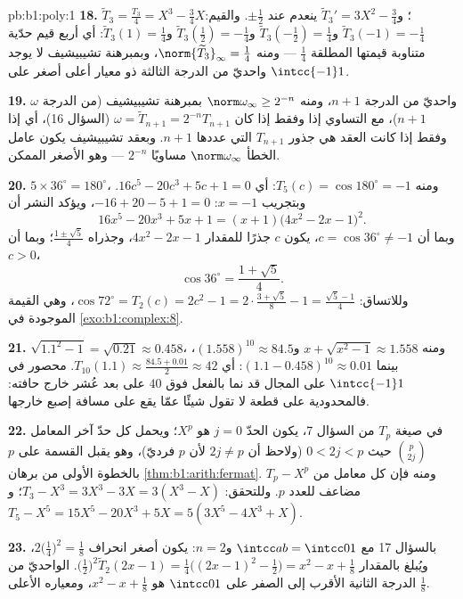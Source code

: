 \begin{solution}{pb:b1:poly:1}
\textbf{18.} $\widetilde T_3 = \frac{T_3}4 = X^3 - \frac34X$؛
و$\widetilde T_3{}' = 3X^2 - \frac34$ ينعدم عند $\pm\frac12$.
والقيم: $\widetilde T_3(-1) = -\frac14$ و$\widetilde
T_3(-\tfrac12) = \frac14$ و$\widetilde T_3(\tfrac12) = -\frac14$
و$\widetilde T_3(1) = \frac14$: أي أربع قيم حدّية متناوبة
قيمتها المطلقة $\frac14$ --- ومنه $\norm{\widetilde T_3}_\infty =
\frac14$، وبمبرهنة تشيبيشيف لا يوجد  واحديّ من الدرجة الثالثة ذو معيار
أعلى أصغر على $\intcc{-1}1$.

\textbf{19.}  $\omega$ واحديّ من الدرجة $n + 1$، ومنه
$\norm\omega_\infty \geq 2^{-n}$ بمبرهنة تشيبيشيف (من الدرجة
$n+1$)، مع التساوي إذا وفقط إذا كان $\omega = \widetilde T_{n+1}
= 2^{-n}T_{n+1}$ (السؤال 16)، أي إذا وفقط إذا كانت العقد
هي جذور $T_{n+1}$ التي عددها $n + 1$. وبعقد تشيبيشيف يكون عامل
الخطأ $\norm\omega_\infty$ مساويًا $2^{-n}$ --- وهو الأصغر الممكن.

\textbf{20.} $5 \times 36^\circ = 180^\circ$، ومنه $T_5(c) =
\cos180^\circ = -1$: أي $16c^5 - 20c^3 + 5c + 1 = 0$. وبتجريب $x =
-1$: $-16 + 20 - 5 + 1 = 0$، ويؤكد النشر أن
\[
16x^5 - 20x^3 + 5x + 1 = (x + 1)\bigl(4x^2 - 2x - 1\bigr)^2 .
\]
وبما أن $c = \cos36^\circ \neq -1$، يكون $c$ جذرًا للمقدار $4x^2 - 2x -
1$، وجذراه $\frac{1 \pm \sqrt5}4$؛ وبما أن $c > 0$،
\[
\cos36^\circ = \frac{1 + \sqrt5}4 .
\]
وللاتساق: $\cos72^\circ = T_2(c) = 2c^2 - 1 = 2\cdot\frac{3 +
\sqrt5}8 - 1 = \frac{\sqrt5 - 1}4$، وهي القيمة الموجودة في
\cref{exo:b1:complex:8}.

\textbf{21.} $\sqrt{1.1^2 - 1} = \sqrt{0.21} \approx 0.458$، ومنه
$x + \sqrt{x^2-1} \approx 1.558$ و$(1.558)^{10} \approx 84.5$،
بينما $(1.1 - 0.458)^{10} \approx 0.01$: أي $T_{10}(1.1) \approx
\frac{84.5 + 0.01}2 \approx 42$.  محصور في
$\intcc{-1}1$ على المجال قد نما بالفعل فوق $40$ على بعد عُشر
خارج حافته: فالمحدودية على قطعة لا تقول شيئًا عمّا يقع
على مسافة إصبع خارجها.

\textbf{22.} في صيغة $T_p$ من السؤال 7، يكون الحدّ $j = 0$
هو $X^p$؛ ويحمل كل حدّ آخر المعامل $\binom p{2j}$ حيث $0 < 2j <
p$ (ولاحظ أن $2j \neq p$ لأن $p$ فرديّ)، وهو يقبل القسمة على $p$
بالخطوة الأولى من برهان \cref{thm:b1:arith:fermat}.
ومنه فإن كل معامل من $T_p - X^p$ مضاعف للعدد $p$.
وللتحقق: $T_3 - X^3 = 3X^3 - 3X = 3(X^3 - X)$؛ و$T_5 - X^5 = 15X^5
- 20X^3 + 5X = 5(3X^5 - 4X^3 + X)$.

\textbf{23.} بالسؤال 17 مع $\intcc ab = \intcc01$ و$n =
2$: يكون أصغر انحراف $2\bigl(\frac14\bigr)^2 = \frac18$،
ويُبلغ بالمقدار $\bigl(\frac12\bigr)^2\widetilde T_2(2x - 1) =
\frac14\bigl((2x-1)^2 - \frac12\bigr) = x^2 - x + \frac18$. 
الواحديّ من الدرجة الثانية الأقرب إلى الصفر على $\intcc01$ هو $x^2 - x +
\frac18$، ومعياره الأعلى $\frac18$.


\end{solution}
